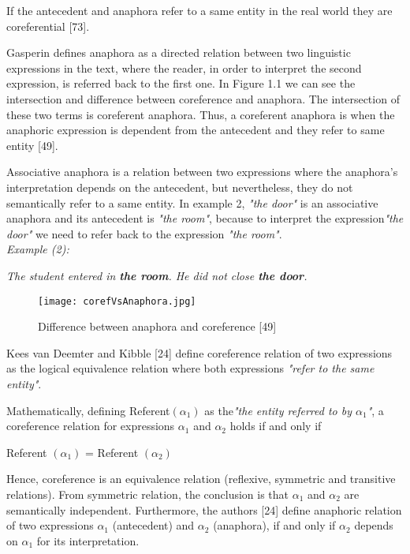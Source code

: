 If the antecedent and anaphora refer to a same entity in the real world they are coreferential [73].

Gasperin defines anaphora as a directed relation between two linguistic expressions in the text, where the reader, in order to interpret the second expression, is referred back to the first one. In Figure 1.1 we can see the intersection and difference between coreference and anaphora. The intersection of these two terms is coreferent anaphora. Thus, a coreferent anaphora is when the anaphoric expression is dependent from the antecedent and they refer to same entity [49].

Associative anaphora is a relation between two expressions where the anaphora's interpretation depends on the antecedent, but nevertheless, they do not semantically refer to a same entity. In example 2, \emph{"the door"} is an associative anaphora and its antecedent is \emph{"the room"}, because to interpret the expression\emph{"the door"} we need to refer back to the expression \emph{"the room"}.\\

\emph{Example (2):}
\begin{changemargin}{10mm}{10mm} 
   \emph{  The student entered in \textbf{the room}. He did not close \textbf{ the door}.}
   \vspace{5mm} 
\end{changemargin}  
\begin{figure}[ht]
   \begin{center}
	  \texttt{[image: corefVsAnaphora.jpg]} 
 	  \caption[Difference between anaphora and coreference]{Difference between anaphora and coreference [49]}
	  \label{Figure 1}
   \end{center}
\end{figure}

Kees van Deemter and Kibble [24] define coreference relation of two expressions as the logical equivalence relation where both expressions \emph{"refer to the same entity"}.
 
Mathematically, defining Referent$(\alpha_1)$ as the\emph{"the entity referred to by $\alpha_1$"}, a coreference relation for expressions $\alpha_1$ and $\alpha_2$ holds if and only if 
\begin{center}
  Referent $(\alpha_1)$ = Referent $(\alpha_2)$
\end{center}
 
Hence, coreference is an equivalence relation (reflexive, symmetric and transitive relations). From symmetric relation, the conclusion is that $\alpha_1$ and $\alpha_2$ are semantically independent. Furthermore, the authors [24] define anaphoric relation of two expressions $\alpha_1$ (antecedent) and $\alpha_2$ (anaphora), if and only if $\alpha_2$ depends on $\alpha_1$ for its interpretation. 
 
